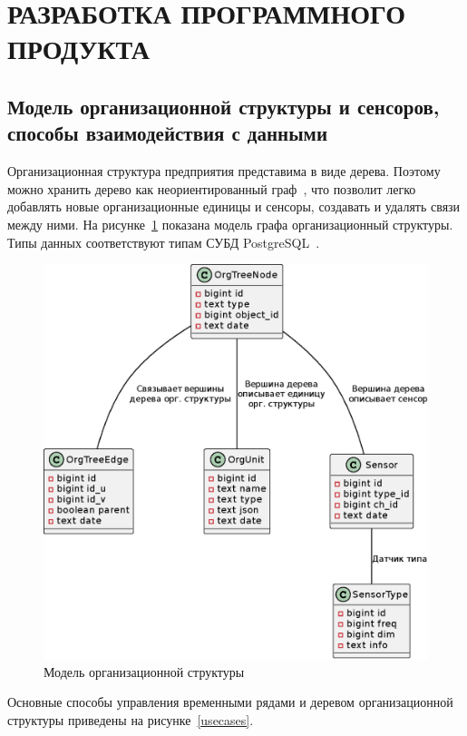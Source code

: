 \section{РАЗРАБОТКА ПРОГРАММНОГО ПРОДУКТА}

\subsection{Модель организационной структуры и сенсоров, способы взаимодействия с данными}

Организационная структура предприятия представима в виде дерева. Поэтому можно хранить дерево как неориентированный граф~\cite{graphs}, что позволит легко добавлять новые организационные единицы и сенсоры, создавать и удалять связи между ними. На рисунке~\ref{datamodel} показана модель графа организационный структуры. Типы данных соответствуют типам СУБД PostgreSQL~\cite{pg-datatypes}.

\begin{figure}
  \includegraphics[scale=1.0]{../img/datamodel.eps}
  \caption{Модель организационной структуры}
  \label{datamodel}
\end{figure}

Основные способы управления временными рядами и деревом организационной структуры приведены на рисунке~\ref{usecases}.

